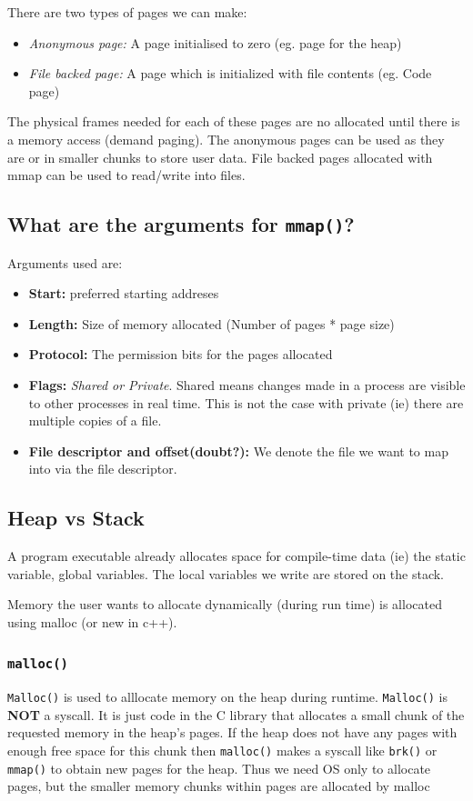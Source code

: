 \documentclass[12pt]{article}
\begin{document}
There are two types of pages we can make:
\begin{itemize}[topsep=0pt, partopsep=0pt, itemsep=0pt, parsep=0pt]
    \item \textit{Anonymous page:} A page initialised to zero (eg. page for the heap)
    \item \textit{File backed page:} A page which is initialized with file contents (eg. Code page) 
\end{itemize}

The physical frames needed for each of these pages are no allocated until there is a memory access (demand paging). The anonymous pages can be 
used as they are or in smaller chunks to store user data. File backed pages allocated with mmap can be used to read/write into files.


\subsection{What are the arguments for \texttt{mmap()}?}
Arguments used are:
\begin{itemize}[topsep=0pt, partopsep=0pt, itemsep=0pt, parsep=0pt]
    \item \textbf{Start:} preferred starting addreses
    \item \textbf{Length:} Size of memory allocated (Number of pages * page size)
    \item \textbf{Protocol:} The permission bits for the pages allocated
    \item \textbf{Flags:} \textit{Shared or Private}. Shared means changes made in a process are visible to other processes in real time. This is not the case with private (ie) there are multiple copies of a file.
    \item \textbf{File descriptor and offset(doubt?):} We denote the file we want to map into via the file descriptor. 
\end{itemize}

\subsection{Heap vs Stack}
A program executable already allocates space for compile-time data (ie) the static variable, global variables.
The local variables we write are stored on the stack. 

Memory the user wants to allocate dynamically (during run time) is allocated using malloc (or new in c++).

\subsubsection{\texttt{malloc()}}
\texttt{Malloc()} is used to alllocate memory on the heap during runtime. \texttt{Malloc()} is \textbf{NOT} a syscall. It is just code in the C library that allocates a small chunk of the requested memory in the heap's pages. 
If the heap does not have any pages with enough free space for this chunk then \texttt{malloc()} makes a syscall like \texttt{brk()} or \texttt{mmap()} to obtain new pages for the heap. Thus we need OS only to allocate pages, but the smaller memory chunks within pages are allocated by malloc
\end{document}
